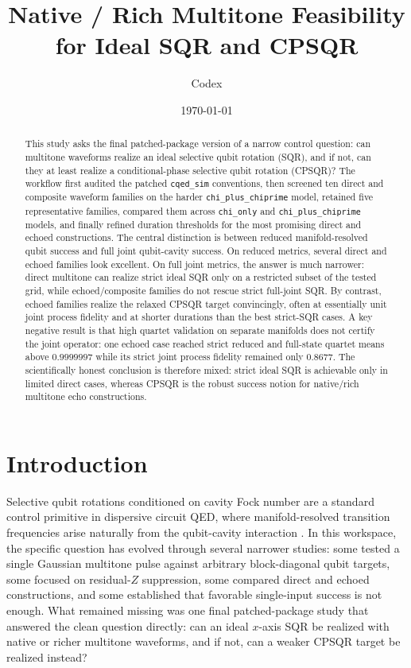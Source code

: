 \documentclass[aps,pra,twocolumn,reprint,floatfix,amsmath,amssymb]{revtex4-2}
\begin{document}
\title{Native / Rich Multitone Feasibility for Ideal SQR and CPSQR}
\author{Codex}
\date{\today}

\begin{abstract}
This study asks the final patched-package version of a narrow control question: can multitone waveforms realize an ideal selective qubit rotation (SQR), and if not, can they at least realize a conditional-phase selective qubit rotation (CPSQR)? The workflow first audited the patched \texttt{cqed\_sim} conventions, then screened ten direct and composite waveform families on the harder \texttt{chi\_plus\_chiprime} model, retained five representative families, compared them across \texttt{chi\_only} and \texttt{chi\_plus\_chiprime} models, and finally refined duration thresholds for the most promising direct and echoed constructions. The central distinction is between reduced manifold-resolved qubit success and full joint qubit-cavity success. On reduced metrics, several direct and echoed families look excellent. On full joint metrics, the answer is much narrower: direct multitone can realize strict ideal SQR only on a restricted subset of the tested grid, while echoed/composite families do not rescue strict full-joint SQR. By contrast, echoed families realize the relaxed CPSQR target convincingly, often at essentially unit joint process fidelity and at shorter durations than the best strict-SQR cases. A key negative result is that high quartet validation on separate manifolds does not certify the joint operator: one echoed case reached strict reduced and full-state quartet means above $0.9999997$ while its strict joint process fidelity remained only $0.8677$. The scientifically honest conclusion is therefore mixed: strict ideal SQR is achievable only in limited direct cases, whereas CPSQR is the robust success notion for native/rich multitone echo constructions.
\end{abstract}

\maketitle

\section{Introduction}
Selective qubit rotations conditioned on cavity Fock number are a standard control primitive in dispersive circuit QED, where manifold-resolved transition frequencies arise naturally from the qubit-cavity interaction \cite{blais2021cqed,koch2007transmon}. In this workspace, the specific question has evolved through several narrower studies: some tested a single Gaussian multitone pulse against arbitrary block-diagonal qubit targets, some focused on residual-$Z$ suppression, some compared direct and echoed constructions, and some established that favorable single-input success is not enough. What remained missing was one final patched-package study that answered the clean question directly: can an ideal $x$-axis SQR be realized with native or richer multitone waveforms, and if not, can a weaker CPSQR target be realized instead?
\end{document}
